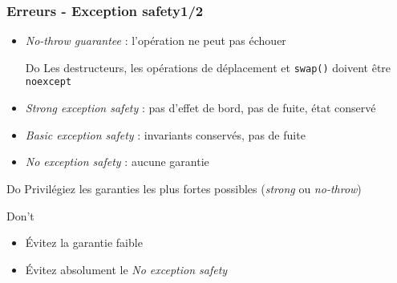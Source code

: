\documentclass[C++.tex]{subfiles}
\begin{document}
\begin{frame}
	\frametitle{Erreurs - Exception safety\titlehfill{}1/2}
	\begin{itemize}
		\item \textit{No-throw guarantee} : l'opération ne peut pas échouer


		\begin{exampleblock}{Do}
			Les destructeurs, les opérations de déplacement et \lstinline|swap()| doivent être \lstinline|noexcept|
		\end{exampleblock}

		\item \textit{Strong exception safety} : pas d'effet de bord, pas de fuite, état conservé


		\item \textit{Basic exception safety} : invariants conservés, pas de fuite


		\item \textit{No exception safety} : aucune garantie
	\end{itemize}

	\begin{exampleblock}{Do}
		Privilégiez les garanties les plus fortes possibles (\textit{strong} ou \textit{no-throw})
	\end{exampleblock}

	\begin{alertblock}{Don't}
		\begin{itemize}
			\item Évitez la garantie faible
			\item Évitez absolument le \textit{No exception safety}
		\end{itemize}
	\end{alertblock}
\end{frame}
\end{document}

